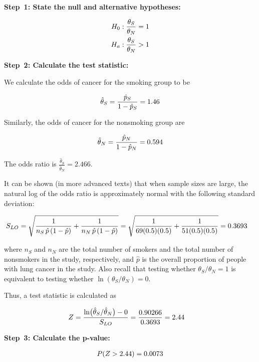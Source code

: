 \documentclass[
]{report}
\begin{document}
\textbf{Step~1: State the null and alternative hypotheses:}

\begin{align}
H_0: \frac{\theta_S}{\theta_N} &= 1 \notag \\ 
H_a: \frac{\theta_S}{\theta_N} &> 1 \notag
\end{align}

\textbf{Step~2: Calculate the test statistic:}

We calculate the odds of cancer for the smoking group to be

\begin{align}
\hat\theta_S = \frac{\hat p_S}{1 - \hat p_S} = 1.46 \notag
\end{align}

Similarly, the odds of cancer for the nonsmoking group are

\begin{align}
\hat\theta_N = \frac{\hat p_N}{1 - \hat p_N} = 0.594 \notag
\end{align}

The odds ratio is \(\frac{\hat\theta_S}{\hat\theta_N} = 2.466.\)

It can be shown (in more advanced texts) that when sample sizes are large, the natural log of the odds ratio is approximately normal with the following standard deviation:

\begin{align}
S_{LO} 
&= \sqrt{\frac{1}{n_S\,\hat p\,(1 - \hat p)} + \frac{1}{n_N\,\hat p\,(1 - \hat p)}} 
= \sqrt{\frac{1}{69(0.5)(0.5)} + \frac{1}{51(0.5)(0.5)}} = 0.3693
\notag
\end{align}

where \(n_S\) and \(n_N\) are the total number of smokers and the total number of nonsmokers in the study, respectively, and \(\hat p\) is the overall proportion of people with lung cancer in the study. Also recall that testing whether \(\theta_S/\theta_N = 1\) is equivalent to testing whether \(\ln(\theta_S/\theta_N) = 0\).

Thus, a test statistic is calculated as

\begin{align}
Z 
&= \frac{\ln\bigl(\hat\theta_S / \hat\theta_N\bigr) - 0}{S_{LO}}
= \frac{0.90266}{0.3693} = 2.44 \notag
\end{align}

\textbf{Step~3: Calculate the p-value:}

\begin{align}
P(Z > 2.44) = 0.0073 
\notag
\end{align}
\end{document}
